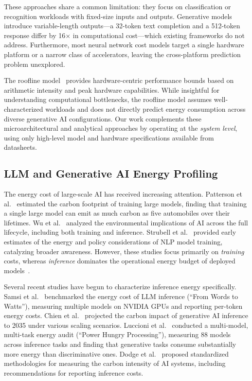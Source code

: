 \documentclass[preprint,review,12pt]{elsarticle}
\begin{document}
These approaches share a common limitation: they focus on classification or recognition workloads with fixed-size inputs and outputs.
Generative models introduce variable-length outputs---a 32-token text completion and a 512-token response differ by 16$\times$ in computational cost---which existing frameworks do not address.
Furthermore, most neural network cost models target a single hardware platform or a narrow class of accelerators, leaving the cross-platform prediction problem unexplored.

The roofline model~\cite{williams2009roofline} provides hardware-centric performance bounds based on arithmetic intensity and peak hardware capabilities.
While insightful for understanding computational bottlenecks, the roofline model assumes well-characterized workloads and does not directly predict energy consumption across diverse generative AI configurations.
Our work complements these microarchitectural and analytical approaches by operating at the \emph{system level}, using only high-level model and hardware specifications available from datasheets.

\subsection{LLM and Generative AI Energy Profiling}
\label{sec:rw_energy_profiling}

The energy cost of large-scale AI has received increasing attention.
Patterson et al.~\cite{patterson2021carbon} estimated the carbon footprint of training large models, finding that training a single large model can emit as much carbon as five automobiles over their lifetimes.
Wu et al.~\cite{wu2022sustainable} analyzed the environmental implications of AI across the full lifecycle, including both training and inference.
Strubell et al.~\cite{strubell2019energy} provided early estimates of the energy and policy considerations of NLP model training, catalyzing broader awareness.
However, these studies focus primarily on \emph{training} costs, whereas \emph{inference} dominates the operational energy budget of deployed models~\cite{desislavov2023trends}.

Several recent studies have begun to characterize inference energy specifically.
Samsi et al.~\cite{samsi2023words} benchmarked the energy cost of LLM inference (``From Words to Watts''), measuring multiple models on NVIDIA GPUs and reporting per-token energy costs.
Chien et al.~\cite{chien2023reducing} projected the carbon impact of generative AI inference to 2035 under various scaling scenarios.
Luccioni et al.~\cite{luccioni2024power} conducted a multi-model, multi-task energy audit (``Power Hungry Processing''), measuring 88 models across inference tasks and finding that generative tasks consume substantially more energy than discriminative ones.
Dodge et al.~\cite{dodge2022measuring} proposed standardized methodologies for measuring the carbon intensity of AI systems, including recommendations for reporting inference costs.
\end{document}
